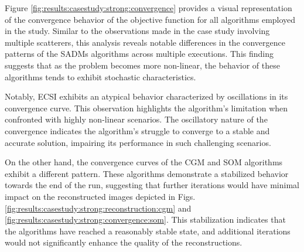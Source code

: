 			
			Figure \ref{fig:results:casestudy:strong:convergence} provides a visual representation of the convergence behavior of the objective function for all algorithms employed in the study. Similar to the observations made in the case study involving multiple scatterers, this analysis reveals notable differences in the convergence patterns of the SADMs algorithms across multiple executions. This finding suggests that as the problem becomes more non-linear, the behavior of these algorithms tends to exhibit stochastic characteristics.
			
			Notably, ECSI exhibits an atypical behavior characterized by oscillations in its convergence curve. This observation highlights the algorithm's limitation when confronted with highly non-linear scenarios. The oscillatory nature of the convergence indicates the algorithm's struggle to converge to a stable and accurate solution, impairing its performance in such challenging scenarios.
			
			On the other hand, the convergence curves of the CGM and SOM algorithms exhibit a different pattern. These algorithms demonstrate a stabilized behavior towards the end of the run, suggesting that further iterations would have minimal impact on the reconstructed images depicted in Figs. \ref{fig:results:casestudy:strong:reconstruction:cgm} and \ref{fig:results:casestudy:strong:convergence:som}. This stabilization indicates that the algorithms have reached a reasonably stable state, and additional iterations would not significantly enhance the quality of the reconstructions.
			
